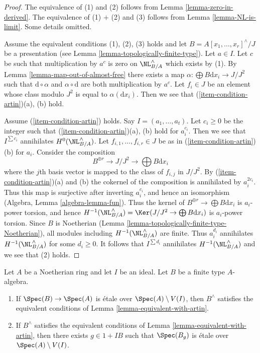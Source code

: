 \begin{proof}
The equivalence of (1) and (2) follows from
Lemma \ref{lemma-zero-in-derived}.
The equivalence of (1) $+$ (2) and (3) follows from
Lemma \ref{lemma-NL-is-limit}. Some details omitted.

\medskip\noindent
Assume the equivalent conditions (1), (2), (3) holds and let
$B = A[x_1, \ldots, x_r]^\wedge/J$ be a presentation
(see Lemma \ref{lemma-topologically-finite-type}). Let $a \in I$.
Let $c$ be such that multiplication by $a^c$ is zero on $\NL_{B/A}^\wedge$
which exists by (1). By Lemma \ref{lemma-map-out-of-almost-free}
there exists a map $\alpha : \bigoplus B\text{d}x_i \to J/J^2$ such that
$\text{d} \circ \alpha$ and $\alpha \circ \text{d}$ are both
multiplication by $a^c$. Let $f_i \in J$ be an element whose
class modulo $J^2$ is equal to $\alpha(\text{d}x_i)$.
Then we see that (\ref{item-condition-artin})(a), (b) hold.

\medskip\noindent
Assume (\ref{item-condition-artin}) holds. Say $I = (a_1, \ldots, a_t)$.
Let $c_i \geq 0$ be the integer such that (\ref{item-condition-artin})(a), (b)
hold for $a_i^{c_i}$. Then we see that $I^{\sum c_i}$ annihilates
$H^0(\NL_{B/A}^\wedge)$. Let $f_{i, 1}, \ldots, f_{i, r} \in J$
be as in (\ref{item-condition-artin})(b) for $a_i$.
Consider the composition
$$
B^{\oplus r} \to J/J^2 \to \bigoplus B\text{d}x_i
$$
where the $j$th basis vector is mapped to the class of $f_{i, j}$ in $J/J^2$.
By (\ref{item-condition-artin})(a) and (b) the cokernel of the composition
is annihilated by $a_i^{2c_i}$. Thus this map is surjective after inverting
$a_i^{c_i}$, and hence an isomorphism (Algebra, Lemma \ref{algebra-lemma-fun}).
Thus the kernel of $B^{\oplus r} \to \bigoplus B\text{d}x_i$ is
$a_i$-power torsion, and hence
$H^{-1}(\NL_{B/A}^\wedge) = \Ker(J/J^2 \to \bigoplus B\text{d}x_i)$
is $a_i$-power torsion. Since $B$ is Noetherian
(Lemma \ref{lemma-topologically-finite-type-Noetherian}),
all modules including $H^{-1}(\NL_{B/A}^\wedge)$ are finite.
Thus $a_i^{d_i}$ annihilates $H^{-1}(\NL_{B/A}^\wedge)$ for some $d_i \geq 0$.
It follows that $I^{\sum d_i}$ annihilates $H^{-1}(\NL_{B/A}^\wedge)$
and we see that (2) holds.
\end{proof}

\begin{lemma}
\label{lemma-rig-etale}
Let $A$ be a Noetherian ring and let $I$ be an ideal.
Let $B$ be a finite type $A$-algebra.
\begin{enumerate}
\item If $\Spec(B) \to \Spec(A)$ is \'etale over $\Spec(A) \setminus V(I)$,
then $B^\wedge$ satisfies the equivalent conditions of
Lemma \ref{lemma-equivalent-with-artin}.
\item If $B^\wedge$ satisfies the equivalent conditions of
Lemma \ref{lemma-equivalent-with-artin},
then there exists $g \in 1 + IB$ such that $\Spec(B_g)$ is \'etale
over $\Spec(A) \setminus V(I)$.
\end{enumerate}
\end{lemma}

